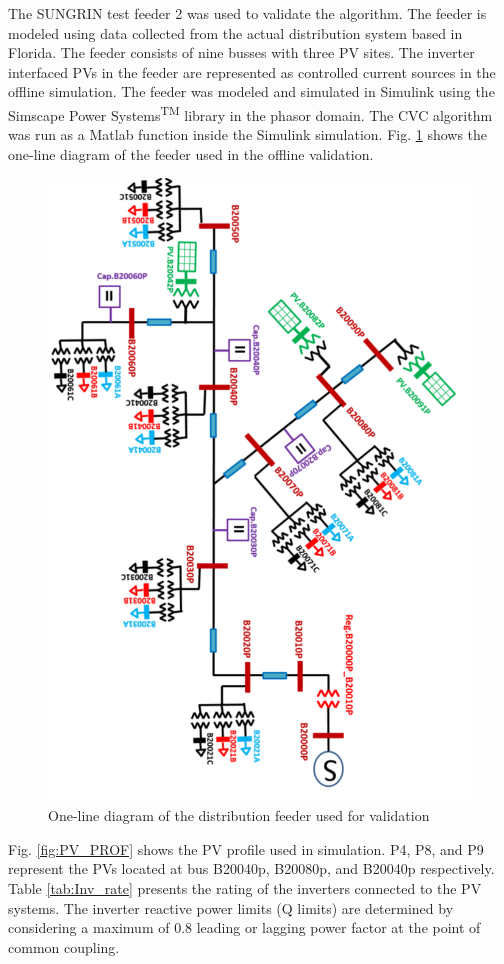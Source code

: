 The SUNGRIN test feeder 2 \cite{SG} was used to validate the algorithm. The feeder is modeled using data collected from the actual distribution system based in Florida. The feeder consists of nine busses with three PV sites. The inverter interfaced PVs in the feeder are represented as controlled current sources in the offline simulation. The feeder was modeled and simulated in Simulink using the Simscape Power Systems\textsuperscript{TM} library in the phasor domain. The CVC algorithm was run as a Matlab function inside the Simulink simulation. Fig. \ref{fig:feeder2} shows the one-line diagram of the feeder used in the offline validation.
\begin{figure}[!htb]
\centering
\includegraphics[width=0.9\linewidth]{figs/feeder_r.png} 
\caption{One-line diagram of the distribution feeder used for validation}
\label{fig:feeder2}
\end{figure}

Fig. \ref{fig:PV_PROF} shows the PV profile used in simulation. P4, P8, and P9 represent the PVs located at bus B20040p, B20080p, and B20040p respectively. Table \ref{tab:Inv_rate} presents the rating of the inverters connected to the PV systems. The inverter reactive power limits (Q limits) are determined by considering a maximum of 0.8 leading or lagging power factor at the point of common coupling.


